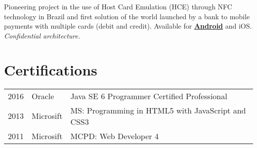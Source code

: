 \documentclass[]{resume}
\begin{document}
\begin{minipage}[t]{0.66\textwidth}
Pioneering project in the use of Host Card Emulation (HCE) through NFC technology in Brazil and first solution of the world launched by a bank to mobile payments with multiple cards (debit and credit). Available for \textbf{\href{https://goo.gl/T7oLwj}{Android}} and iOS.\\
\textit{Confidential architecture.}
\sectionsep


\section{Certifications} 
\begin{tabular}{rll}
2016 & Oracle & Java SE 6 Programmer Certified Professional \\
2013 & Microsift & MS: Programming in HTML5 with JavaScript and CSS3 \\
2011 & Microsift & MCPD: Web Developer 4 \\
\end{tabular}
\sectionsep


% 
% 

\end{minipage} 
\end{document}
